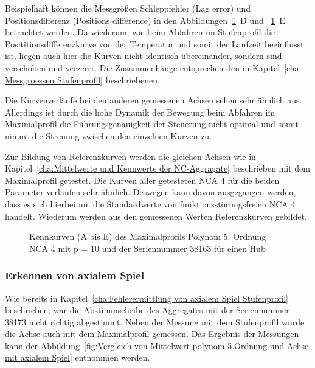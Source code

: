 Beispielhaft können die Messgrößen Schleppfehler (Lag error) und Positionsdifferenz (Positions difference) in den Abbildungen~\ref{fig:Polynom 5. Ordnung NCA 4 mit p = 10 und der Seriennummer 38163}~D und ~\ref{fig:Polynom 5. Ordnung NCA 4 mit p = 10 und der Seriennummer 38163}~E betrachtet werden. Da wiederum, wie beim Abfahren im Stufenprofil die Posititionsdifferenzkurve von der Temperatur und somit der Laufzeit beeinflusst ist, liegen auch hier die Kurven nicht identisch übereinander, sondern sind verschoben und verzerrt. Die Zusammenhänge entsprechen den in Kapitel~\ref{cha: Messgroessen Stufenprofil} beschriebenen.

Die Kurvenverläufe bei den anderen gemessenen Achsen sehen sehr ähnlich aus. Allerdings ist durch die hohe Dynamik der Bewegung beim Abfahren im Maximalprofil die Führungsgenauigkeit der Steuerung nicht optimal und somit nimmt die Streuung zwischen den einzelnen Kurven zu.

Zur Bildung von Referenzkurven werden die gleichen Achsen wie in Kapitel~\ref{cha:Mittelwerte und Kennwerte der NC-Aggragate} beschrieben mit dem Maximalprofil getestet. Die Kurven aller getesteten NCA 4 für die beiden Parameter verlaufen sehr ähnlich. Deswegen kann davon ausgegangen werden, dass es sich hierbei um die Standardwerte von funktionsstörungsfreien NCA 4 handelt. Wiederum werden aus den gemessenen Werten Referenzkurven gebildet.




\clearpage

\begin{figure}[H]
\centering

\caption{Kennkurven (A bis E) des Maximalprofils Polynom 5. Ordnung NCA 4 mit p = 10 und der Seriennummer 38163 für einen Hub}
\label{fig:Polynom 5. Ordnung NCA 4 mit p = 10 und der Seriennummer 38163}
\end{figure}





\subsubsection{Erkennen von axialem Spiel}

Wie bereits in Kapitel~\ref{cha:Fehlerermittlung von axialem Spiel Stufenprofil} beschrieben, war die Abstimmscheibe des Aggregates mit der Seriennummer 38173 nicht richtig abgestimmt. Neben der Messung mit dem Stufenprofil wurde die Achse auch mit dem Maximalprofil gemessen. Das Ergebnis der Messungen kann der Abbildung~\ref{fig:Vergleich von Mittelwert polynom 5.Ordnung und Achse mit axialem Spiel} entnommen werden. 

